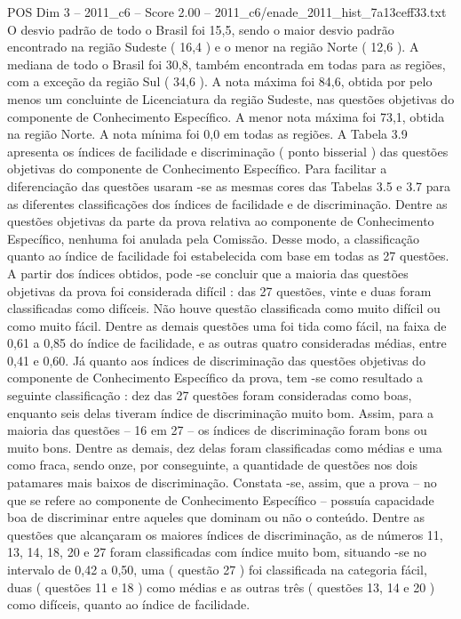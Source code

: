 \begin{textsample}{POS Dim 3 – 2011\_c6 – Score 2.00 – 2011\_c6/enade\_2011\_hist\_7a13ceff33.txt}
O desvio padrão de todo o Brasil foi 15,5, sendo o maior desvio padrão encontrado na região Sudeste ( 16,4 ) e o menor na região Norte ( 12,6 ).
A mediana de todo o Brasil foi 30,8, também encontrada em todas para as regiões, com a exceção da região Sul ( 34,6 ).
A nota máxima foi 84,6, obtida por pelo menos um concluinte de Licenciatura da região Sudeste, nas questões objetivas do componente de Conhecimento Específico.
A menor nota máxima foi 73,1, obtida na região Norte.
A nota mínima foi 0,0 em todas as regiões.
A Tabela 3.9 apresenta os índices de facilidade e discriminação ( ponto bisserial ) das questões objetivas do componente de Conhecimento Específico.
Para facilitar a diferenciação das questões usaram -se as mesmas cores das Tabelas 3.5 e 3.7 para as diferentes classificações dos índices de facilidade e de discriminação.
Dentre as questões objetivas da parte da prova relativa ao componente de Conhecimento Específico, nenhuma foi anulada pela Comissão.
Desse modo, a classificação quanto ao índice de facilidade foi estabelecida com base em todas as 27 questões.
A partir dos índices obtidos, pode -se concluir que a maioria das questões objetivas da prova foi considerada difícil : das 27 questões, vinte e duas foram classificadas como difíceis.
Não houve questão classificada como muito difícil ou como muito fácil.
Dentre as demais questões uma foi tida como fácil, na faixa de 0,61 a 0,85 do índice de facilidade, e as outras quatro consideradas médias, entre 0,41 e 0,60.
Já quanto aos índices de discriminação das questões objetivas do componente de Conhecimento Específico da prova, tem -se como resultado a seguinte classificação : dez das 27 questões foram consideradas como boas, enquanto seis delas tiveram índice de discriminação muito bom.
Assim, para a maioria das questões – 16 em 27 – os índices de discriminação foram bons ou muito bons.
Dentre as demais, dez delas foram classificadas como médias e uma como fraca, sendo onze, por conseguinte, a quantidade de questões nos dois patamares mais baixos de discriminação.
Constata -se, assim, que a prova – no que se refere ao componente de Conhecimento Específico – possuía capacidade boa de discriminar entre aqueles que dominam ou não o conteúdo.
Dentre as questões que alcançaram os maiores índices de discriminação, as de números 11, 13, 14, 18, 20 e 27 foram classificadas com índice muito bom, situando -se no intervalo de 0,42 a 0,50, uma ( questão 27 ) foi classificada na categoria fácil, duas ( questões 11 e 18 ) como médias e as outras três ( questões 13, 14 e 20 ) como difíceis, quanto ao índice de facilidade.

\end{textsample}
